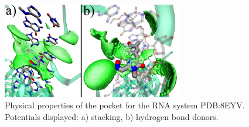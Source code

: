       \begin{figure}[H]
        \centering
        \includegraphics[width=0.7\textwidth]{figures/results/benchmark_rna/8eyv.png}
        \caption{\label{fig:benchmark/8eyv} Physical properties of the pocket for the RNA system PDB:8EYV. Potentials displayed: a) stacking, b) hydrogen bond donors.}
      \end{figure}
    \pagebreak


